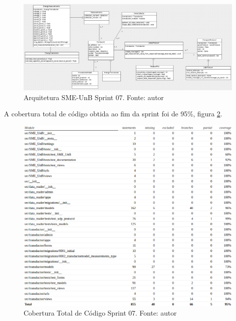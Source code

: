 \begin{figure}[!htpb]
    \centering
    \includegraphics[scale=0.4,angle=90]{figuras/sprint07arq.eps}
    \caption{Arquitetura SME-UnB Sprint 07. Fonte: autor}
    \label{sprint07arq}
\end{figure}

A cobertura total de código obtida ao fim da sprint foi de 95\%, figura \ref{cobertura04}.
\begin{figure}[!htpb]
    \centering
    \includegraphics[keepaspectratio=true,scale=0.5]{figuras/cobertura04.eps}
    \caption{Cobertura Total de Código Sprint 07. Fonte: autor}
    \label{cobertura04}
\end{figure}


